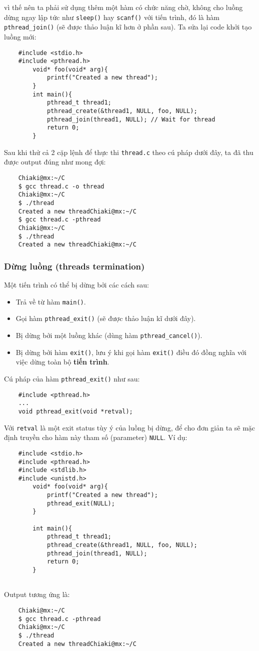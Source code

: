 \documentclass{article}
\begin{document}
vì thế nên ta phải sử dụng thêm một hàm có chức năng chờ, không cho luồng dừng ngay lập tức như \verb|sleep()| hay \verb|scanf()| với tiến trình, đó là hàm \verb|pthread_join()| (sẽ được thảo luận kĩ hơn ở phần sau).
Ta sửa lại code khởi tạo luồng mới:
\begin{verbatim}
    #include <stdio.h>
    #include <pthread.h>
        void* foo(void* arg){
            printf("Created a new thread");
        }
        int main(){
            pthread_t thread1;
            pthread_create(&thread1, NULL, foo, NULL);
            pthread_join(thread1, NULL); // Wait for thread
            return 0;
        }  
\end{verbatim}
Sau khi thử cả 2 cặp lệnh để thực thi \verb|thread.c| theo cú pháp dưới đây, ta đã thu được output đúng như mong đợi:
\begin{verbatim}
    Chiaki@mx:~/C
    $ gcc thread.c -o thread
    Chiaki@mx:~/C
    $ ./thread
    Created a new threadChiaki@mx:~/C
    $ gcc thread.c -pthread
    Chiaki@mx:~/C
    $ ./thread
    Created a new threadChiaki@mx:~/C
\end{verbatim}
\subsubsection{Dừng luồng (threads termination)}
Một tiến trình có thể bị dừng bởi các cách sau:
\begin{itemize}
    \item Trả về từ hàm \verb|main()|.
    \item Gọi hàm \verb|pthread_exit()| (sẽ được thảo luận kĩ dưới đây).
    \item Bị dừng bởi một luồng khác (dùng hàm \verb|pthread_cancel()|).
    \item Bị dừng bởi hàm \verb|exit()|, lưu ý khi gọi hàm \verb|exit()| điều đó đồng nghĩa với việc dừng toàn bộ \textbf{tiến trình}.
\end{itemize}
Cú pháp của hàm \verb|pthread_exit()| như sau:
\begin{verbatim}
    #include <pthread.h>
    ... 
    void pthread_exit(void *retval);
\end{verbatim}
Với \verb|retval| là một exit status tùy ý của luồng bị dừng, để cho đơn giản ta sẽ mặc định truyền cho hàm này tham số (parameter) \verb|NULL|. Ví dụ:
\begin{verbatim}
    #include <stdio.h>
    #include <pthread.h>
    #include <stdlib.h>
    #include <unistd.h>
        void* foo(void* arg){
            printf("Created a new thread");
            pthread_exit(NULL);
        }
    
        int main(){
            pthread_t thread1;
            pthread_create(&thread1, NULL, foo, NULL);
            pthread_join(thread1, NULL);
            return 0;
        }
    
\end{verbatim}
Output tương ứng là:
\begin{verbatim}
    Chiaki@mx:~/C
    $ gcc thread.c -pthread
    Chiaki@mx:~/C
    $ ./thread
    Created a new threadChiaki@mx:~/C    
\end{verbatim}
\end{document}
